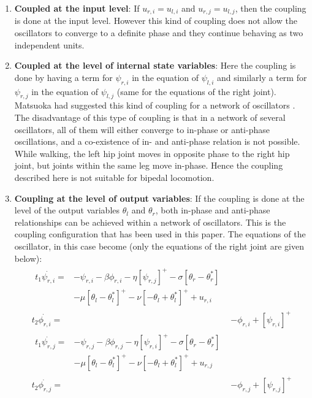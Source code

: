 \documentclass[12pt,twoside]{article}
\theoremstyle{plain}
\theoremstyle{definition}
\theoremstyle{remark}
\begin{document}
\begin{enumerate}
\item \textbf{Coupled at the input level}: If $u_{r,i}=u_{l,i}$ and $u_{r,j}=u_{l,j}$, then the coupling is done at the input level. However this kind of coupling does not allow the oscillators to converge to a definite phase and they continue behaving as two independent units.
\item \textbf{Coupled at the level of internal state variables}: Here the coupling is done by having a term for $\psi_{r,i}$ in the equation of $\psi_{l,i}$ and similarly a term for $\psi_{r,j}$ in the equation of $\psi_{l,j}$ (same for the equations of the right joint). Matsuoka had suggested this kind of coupling for a network of oscillators \cite{Matsuoka1987}. The disadvantage of this type of coupling is that in a network of several oscillators, all of them will either converge to in-phase or anti-phase oscillations, and a co-existence of in- and anti-phase relation is not possible. While walking, the left hip joint moves in opposite phase to the right hip joint, but joints within the same leg move in-phase. Hence the coupling described here is not suitable for bipedal locomotion.
\item \textbf{Coupling at the level of output variables}: If the coupling is done at the level of the output variables $\theta_l$ and $\theta_r$, both in-phase and anti-phase relationships can be achieved within a network of oscillators. This is the coupling configuration that has been used in this paper. The equations of the oscillator, in this case become (only the equations of the right joint are given below):\\

\begin{subequations}
\label{eq:matsuoka_coupled}
%
\begin{align}
\label{eq:matsuoka_coupled1}
\begin{split}
t_1 \dot{\psi_{r,i}}={}& -\psi_{r,i} - \beta \phi_{r,i} - \eta [\psi_{r,j}]^+ - \sigma [\theta_r - \theta^{*}_r]\\ 
& - \mu [\theta_l - \theta_l^*]^+ - \nu [-\theta_l + \theta_l^*]^+ + u_{r,i} 
\end{split}
\\
%
\label{eq:matsuoka_coupled2}
t_2 \dot{\phi_{r,i}} = {}& -\phi_{r,i} + [\psi_{r,i}]^+
\\
%
\label{eq:matsuoka_coupled3}
\begin{split}
t_1 \dot{\psi_{r,j}}={}& -\psi_{r,j} - \beta \phi_{r,j} - \eta [\psi_{r,i}]^+ - \sigma [\theta_r - \theta^{*}_r]\\
& - \mu [\theta_l - \theta_l^*]^+ - \nu [-\theta_l + \theta_l^*]^+ + u_{r,j}
\end{split}
\\
%
\label{eq:matsuoka_coupled4}
t_2 \dot{\phi_{r,j}} ={}& -\phi_{r,j} + [\psi_{r,j}]^+
\end{align}
%
\end{subequations}


\end{enumerate}
\end{document}
